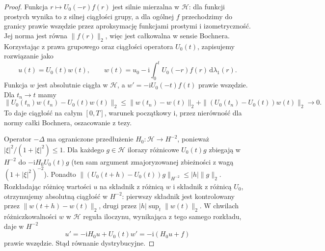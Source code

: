 \begin{proof}
Funkcja $r\mapsto U_0(-r)f(r)$ jest silnie
mierzalna w $\mathcal H$: dla funkcji prostych
wynika to z silnej ciągłości grupy, a dla ogólnej
$f$ przechodzimy do granicy prawie wszędzie
przez aproksymację funkcjami prostymi i izometryczność.
Jej norma jest równa $\|f(r)\|_2$,
więc jest całkowalna w sensie Bochnera.
Korzystając z prawa grupowego oraz ciągłości
operatora $U_0(t)$, zapisujemy rozwiązanie jako
\[
 u(t)=U_0(t)w(t),\qquad
 w(t)=u_0-\mathrm i\int_0^t U_0(-r)f(r)\,\mathrm d\lambda_1(r).
\]
Funkcja $w$ jest absolutnie ciągła w $\mathcal H$,
a $w'=-\mathrm i U_0(-t)f(t)$ prawie wszędzie.
Dla $t_n\to t$ mamy
\[
 \|U_0(t_n)w(t_n)-U_0(t)w(t)\|_2
 \le\|w(t_n)-w(t)\|_2+
       \|(U_0(t_n)-U_0(t))w(t)\|_2\to0.
\]
To daje ciągłość na całym $[0,T]$, warunek początkowy
i, przez nierówność dla normy całki Bochnera,
oszacowanie z tezy.

Operator $-\Delta$ ma ograniczone przedłużenie
$H_0:\mathcal H\to H^{-2}$, ponieważ
$|\xi|^2/(1+|\xi|^2)\le1$. Dla każdego $g\in\mathcal H$
ilorazy różnicowe $U_0(t)g$ zbiegają w $H^{-2}$
do $-\mathrm i H_0U_0(t)g$ (ten sam argument
zmajoryzowanej zbieżności z wagą $(1+|\xi|^2)^{-2}$).
Ponadto
$\|(U_0(t+h)-U_0(t))g\|_{H^{-2}}\le |h|\|g\|_2$.
Rozkładając różnicę wartości $u$ na składnik
z różnicą $w$ i składnik z różnicą $U_0$,
otrzymujemy absolutną ciągłość w $H^{-2}$:
pierwszy składnik jest kontrolowany przez
$\|w(t+h)-w(t)\|_2$, drugi przez $|h|\sup_t\|w(t)\|_2$.
W chwilach różniczkowalności $w$ w $\mathcal H$
reguła iloczynu, wynikająca z tego samego rozkładu,
daje w $H^{-2}$
\[
 u'=-\mathrm iH_0u+U_0(t)w'
    =-\mathrm i(H_0u+f)
\]
prawie wszędzie. Stąd równanie dystrybucyjne.


\end{proof}
